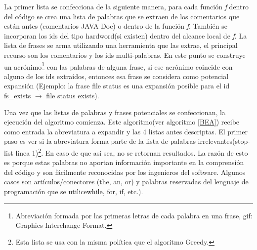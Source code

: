 \documentclass[a4paper,12pt]{report}
\begin{document}
La primer lista se confecciona de la siguiente manera, para cada función \textit{f} dentro del código se crea una lista de palabras que se extraen de los comentarios que están antes (comentarios JAVA Doc) o dentro de la función \textit{f}. También se incorporan los ids del tipo hardword(si existen) dentro del alcance local de \textit{f}. La lista de frases se arma utilizando una herramienta que las extrae\cite{FFCW01}, el principal recurso son los comentarios y los ids multi-palabras. En este punto se construye un acrónimo\footnote[1]{Abreviación formada por las primeras letras de cada palabra en una frase, gif: Graphics Interchange Format.} con las palabras de alguna frase, si ese acrónimo coincide con alguno de los ids extraídos, entonces esa frase se considera como potencial expansión (Ejemplo: la frase \textsf{file status} es una expansión posible para el id \textsf{fs\_exists} $\rightarrow$ \textsf{file status exists}).

Una vez que las listas de palabras y frases potenciales se confeccionan, la ejecución del algoritmo comienza. Este algoritmo(ver algoritmo \ref{BEA}) recibe como entrada la abreviatura a expandir y las 4 listas antes descriptas. El primer paso es ver si la abreviatura forma parte de la lista de palabras irrelevantes(stop-list línea 1)\footnote[2]{Esta lista se usa con la misma política que el algoritmo Greedy.}. En caso de que así sea, no se retornan resultados. La razón de esto es porque estas palabras no aportan información importante en la comprensión del código y son fácilmente reconocidas por los ingenieros del software. Algunos casos son artículos/conectores (the, an, or) y palabras reservadas del lenguaje de programación que se utilice\textsf{while, for, if,} etc.).
\end{document}
